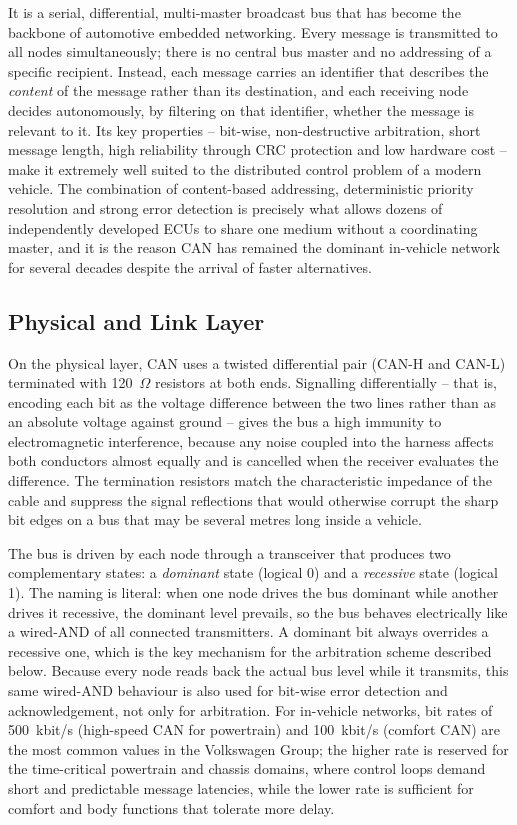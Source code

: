 \documentclass[11pt,a4paper,oneside,parskip=half]{scrreprt}
\begin{document}
It is a serial, differential, multi-master broadcast bus that has become the backbone of automotive embedded networking. Every message is transmitted to all nodes simultaneously; there is no central bus master and no addressing of a specific recipient. Instead, each message carries an identifier that describes the \emph{content} of the message rather than its destination, and each receiving node decides autonomously, by filtering on that identifier, whether the message is relevant to it. Its key properties -- bit-wise, non-destructive arbitration, short message length, high reliability through CRC protection and low hardware cost -- make it extremely well suited to the distributed control problem of a modern vehicle. The combination of content-based addressing, deterministic priority resolution and strong error detection is precisely what allows dozens of independently developed ECUs to share one medium without a coordinating master, and it is the reason CAN has remained the dominant in-vehicle network for several decades despite the arrival of faster alternatives.

\subsection{Physical and Link Layer}
On the physical layer, CAN uses a twisted differential pair (CAN-H and CAN-L) terminated with 120~$\Omega$ resistors at both ends. Signalling differentially -- that is, encoding each bit as the voltage difference between the two lines rather than as an absolute voltage against ground -- gives the bus a high immunity to electromagnetic interference, because any noise coupled into the harness affects both conductors almost equally and is cancelled when the receiver evaluates the difference. The termination resistors match the characteristic impedance of the cable and suppress the signal reflections that would otherwise corrupt the sharp bit edges on a bus that may be several metres long inside a vehicle.

The bus is driven by each node through a transceiver that produces two complementary states: a \textit{dominant} state (logical 0) and a \textit{recessive} state (logical 1). The naming is literal: when one node drives the bus dominant while another drives it recessive, the dominant level prevails, so the bus behaves electrically like a wired-AND of all connected transmitters. A dominant bit always overrides a recessive one, which is the key mechanism for the arbitration scheme described below. Because every node reads back the actual bus level while it transmits, this same wired-AND behaviour is also used for bit-wise error detection and acknowledgement, not only for arbitration. For in-vehicle networks, bit rates of 500~kbit/s (high-speed CAN for powertrain) and 100~kbit/s (comfort CAN) are the most common values in the Volkswagen Group; the higher rate is reserved for the time-critical powertrain and chassis domains, where control loops demand short and predictable message latencies, while the lower rate is sufficient for comfort and body functions that tolerate more delay.
\end{document}
